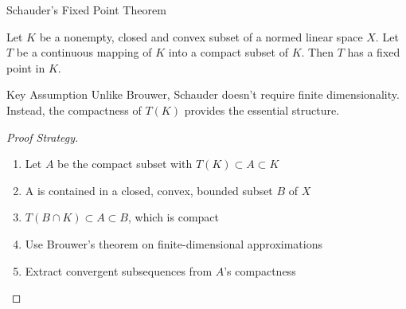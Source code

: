 \documentclass[aspectratio=169,10pt]{beamer}
\begin{document}
\begin{frame}[allowframebreaks]{Schauder's Fixed Point Theorem}
    \begin{theorem}
        Let $K$ be a nonempty, closed and convex subset of a normed linear space $X$. Let $T$ be a continuous mapping of $K$ into a compact subset of $K$. Then $T$ has a fixed point in $K$.
    \end{theorem}

    \begin{block}{Key Assumption}
        Unlike Brouwer, Schauder doesn't require finite dimensionality. Instead, the compactness of $T(K)$ provides the essential structure.
    \end{block}

    \begin{proof}[Proof Strategy]
        \begin{enumerate}
            \item Let $A$ be the compact subset with $T(K) \subset A \subset K$
            \item A is contained in a closed, convex, bounded subset $B$ of $X$
            \item $T(B \cap K) \subset A \subset B$, which is compact
            \item Use Brouwer's theorem on finite-dimensional approximations
            \item Extract convergent subsequences from $A$'s compactness
        \end{enumerate}
    \end{proof}
\end{frame}
\end{document}
